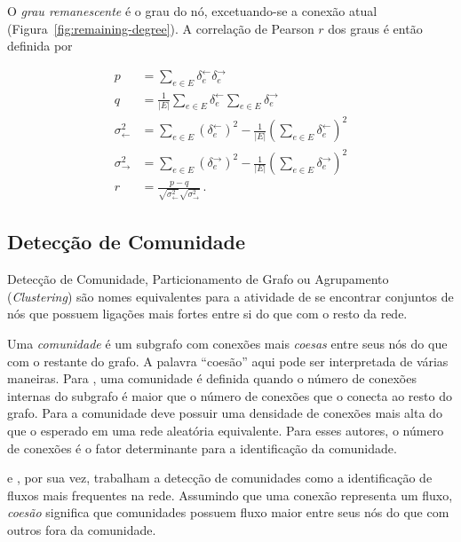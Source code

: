 \documentclass[12pt,a4paper]{article}
\begin{document}
O \textit{grau remanescente} é o grau do nó, excetuando-se a conexão atual (Figura~\ref{fig:remaining-degree}). A correlação de Pearson $r$ dos graus é então definida por

\begin{align*}
p &= \sum_{e \in E} \delta_e^\leftarrow \delta_e^\rightarrow
\\
q &= \frac{1}{|E|} \sum_{e \in E} \delta_e^\leftarrow
\sum_{e \in E }\delta_e^\rightarrow
\\
\sigma^2_\leftarrow &= \sum_{e \in E} \left( \delta_e^\leftarrow \right)^2
- \frac{1}{|E|} \left( \sum_{e \in E} \delta_e^\leftarrow \right)^2
\\
\sigma^2_\rightarrow &= \sum_{e \in E} \left( \delta_e^\rightarrow \right)^2
- \frac{1}{|E|} \left( \sum_{e \in E} \delta_e^\rightarrow \right)^2
\\
r &= \frac{p - q}
{\sqrt{ \sigma^2_\leftarrow } \sqrt{ \sigma^2_\rightarrow }}\,.
\end{align*}


\subsection{Detecção de Comunidade} \label{sec:deteccao-comunidade}

Detecção de Comunidade, Particionamento de Grafo ou Agrupamento (\textit{Clustering}) são nomes equivalentes para a atividade de se encontrar conjuntos de nós que possuem ligações mais fortes entre si do que com o resto da rede.

Uma \textit{comunidade} é um subgrafo com conexões mais \textit{coesas} entre seus nós do que com o restante do grafo. A palavra \enquote{coesão} aqui pode ser interpretada de várias maneiras. Para , uma comunidade é definida quando o número de conexões internas do subgrafo é maior que o número de conexões que o conecta ao resto do grafo. Para  a comunidade deve possuir uma densidade de conexões mais alta do que o esperado em uma rede aleatória equivalente. Para esses autores, o número de conexões é o fator determinante para a identificação da comunidade.

 e , por sua vez, trabalham a detecção de comunidades como a identificação de fluxos mais frequentes na rede. Assumindo que uma conexão representa um fluxo, \textit{coesão} significa que comunidades possuem fluxo maior entre seus nós do que com outros fora da comunidade.
\end{document}
